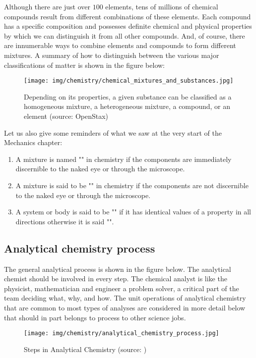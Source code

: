	Although there are just over $100$ elements, tens of millions of chemical compounds result from different combinations of these elements. Each compound has a specific composition and possesses definite chemical and physical properties by which we can distinguish it from all other compounds. And, of course, there are innumerable ways to combine elements and compounds to form different mixtures. A summary of how to distinguish between the various major classifications of matter is shown in the figure below:
	\begin{figure}[H]
		\centering
		\texttt{[image: img/chemistry/chemical\_mixtures\_and\_substances.jpg]}
		\caption[Homogeneous mixture, heterogeneous mixture, compound or element]{Depending on its properties, a given substance can be classified as a homogeneous mixture, a heterogeneous mixture, a compound, or an element (source: OpenStax)}
	\end{figure}

	Let us also give some reminders of what we saw at the very start of the Mechanics chapter:
	\begin{enumerate}
		\item A mixture is named "" in chemistry if the components are immediately discernible to the naked eye or through the microscope.
		
		\item A mixture is said to be "" in chemistry if the components are not discernible to the naked eye or through the microscope.
		
		\item A system or body is said to be "" if it has identical values of a property in all directions otherwise it is said "".
	\end{enumerate}
	
	\subsection{Analytical chemistry process}
	The general analytical process is shown in the figure below. The analytical chemist should be involved in every step. The chemical analyst is like the physicist, mathematician and engineer a problem solver, a critical part of the team deciding what, why, and how. The unit operations of analytical chemistry that are common to most types of analyses are considered in more detail below that should in part belongs to process to other science jobs.
	\begin{figure}[H]
		\centering
		\texttt{[image: img/chemistry/analytical\_chemistry\_process.jpg]}
		\caption[Steps in Analytical Chemistry]{Steps in Analytical Chemistry (source: \cite{christian2013analytical})}
	\end{figure}	

